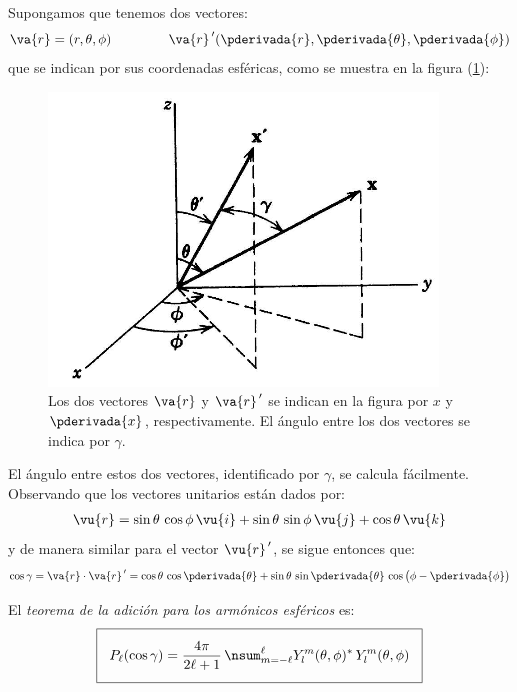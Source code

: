 Supongamos que tenemos dos vectores:
\begin{align}
\va{r} = (r, \theta, \phi) \hspace{1.5cm} \va{r}^{\, \prime} (\pderivada{r}, \pderivada{\theta}, \pderivada{\phi})
\end{align}
que se indican por sus coordenadas esféricas, como se muestra en la figura (\ref{fig:figura_01}):
\begin{figure}[H]
    \centering
    \includegraphics[scale=0.7]{Imagenes/Teorema_Adicion_01.png}
    \caption{Los dos vectores $\va{r}$ y $\va{r}^{\, \prime}$ se indican en la figura por $x$ y $\pderivada{x}$, respectivamente. El ángulo entre los dos vectores se indica por $\gamma$.}
    \label{fig:figura_01}
\end{figure}
El ángulo entre estos dos vectores, identificado por $\gamma$, se calcula fácilmente. Observando que los vectores unitarios están dados por:
\begin{align*}
\vu{r} = \sin \theta \, \cos \phi \, \vu{i} + \sin \theta \, \sin \phi \, \vu{j} + \cos \theta \, \vu{k}
\end{align*}
y de manera similar para el vector $\vu{r}^{\, \prime}$, se sigue entonces que:
\begin{align}
\cos \gamma = \va{r} \cdot \va{r}^{\, \prime} = \cos \theta \, \cos \pderivada{\theta} + \sin \theta \, \sin \pderivada{\theta} \, \cos \big( \phi - \pderivada{\phi} \big)
\label{eq:ecuacion_021}
\end{align}

El \emph{teorema de la adición para los armónicos esféricos} es:
\begin{align*}
\setlength{\fboxsep}{3\fboxsep}\boxed{
P_{\ell} (\cos \gamma) = \dfrac{4 \pi}{2 \ell + 1} \, \nsum_{m=-\ell}^{\ell} Y_{l}^{m} (\theta, \phi)^{*} \, Y_{l}^{m} (\theta, \phi) }
\end{align*}
